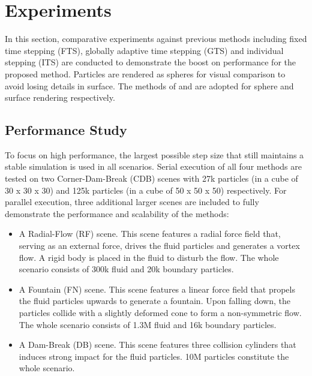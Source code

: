 \documentclass[
	11pt, 
	DIV10,
	ngerman,
	a4paper, 
	oneside, 
	headings=normal, 
	captions=tableheading,
	final, 
	numbers=noenddot
]{scrartcl}
\begin{document}
\section{Experiments}
In this section, comparative experiments against previous methods including fixed time stepping (FTS), globally adaptive time stepping (GTS) \cite{desbrun1996smoothed} and individual stepping (ITS) \cite{ban2018adaptively} are conducted to demonstrate the boost on performance for the proposed method. Particles are rendered as spheres for visual comparison to avoid losing details in surface. The methods of \cite{reinhardt2017visual} and \cite{bhatacharya2011level} are adopted for sphere and surface rendering respectively.

\subsection{Performance Study}
To focus on high performance, the largest possible step size that still maintains a stable simulation is used in all scenarios. Serial execution of all four methods are tested on two Corner-Dam-Break (CDB) scenes with 27k particles (in a cube of 30 x 30 x 30) and 125k particles (in a cube of 50 x 50 x 50) respectively. For parallel execution, three additional larger scenes are included to fully demonstrate the performance and scalability of the methods:

\begin{itemize}
    \item A Radial-Flow (RF) scene. This scene features a radial force field that, serving as an external force, drives the fluid particles and generates a vortex flow. A rigid body is placed in the fluid to disturb the flow. The whole scenario consists of 300k fluid and 20k boundary particles.
    \item A Fountain (FN) scene. This scene features a linear force field that propels the fluid particles upwards to generate a fountain. Upon falling down, the particles collide with a slightly deformed cone to form a non-symmetric flow. The whole scenario consists of 1.3M fluid and 16k boundary particles.
    \item A Dam-Break (DB) scene. This scene features three collision cylinders that induces strong impact for the fluid particles. 10M particles constitute the whole scenario.
\end{itemize}
\end{document}
